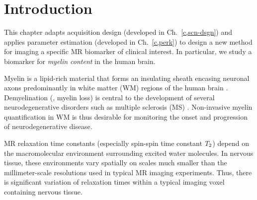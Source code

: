 
\section{Introduction}
\label{s,mwf,intro}

This chapter adapts acquisition design 
(developed in Ch.~\ref{c,scn-dsgn})
and applies parameter estimation 
(developed in Ch.~\ref{c,perk})
to design a new method
for imaging a specific MR biomarker
of clinical interest.
In particular,
we study a biomarker 
for \emph{myelin content} 
in the human brain.

Myelin is a lipid-rich material
that forms an insulating sheath
encasing neuronal axons 
predominantly in white matter (WM) regions
of the human brain
\cite{morell:84}.
Demyelination (\ie, myelin loss) is central
to the development 
of several neurodegenerative disorders
such as multiple sclerosis (MS)
\cite{goldenberg:12:msr}. 
Non-invasive myelin quantification in WM
is thus desirable 
for monitoring the onset and progression
of neurodegenerative disease.

MR relaxation time constants
(especially spin-spin time constant $T_2$)
depend on the macromolecular environment
surrounding excited water molecules.
In nervous tissue,
these environments vary spatially
on scales much smaller 
than the millimeter-scale resolutions
used in typical MR imaging experiments.
Thus, 
there is significant variation
of relaxation times 
within a typical imaging voxel 
containing nervous tissue.

